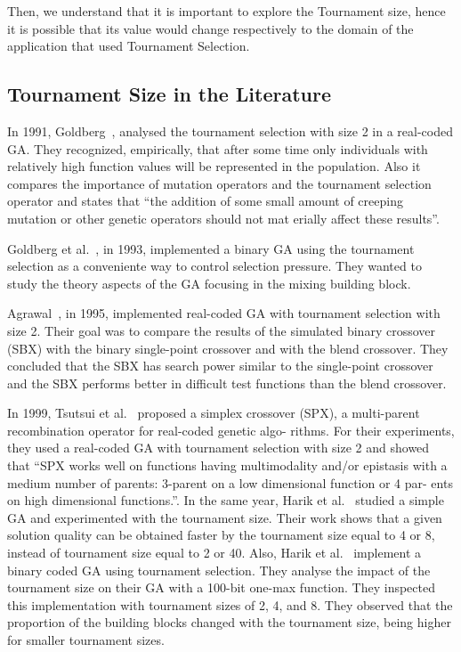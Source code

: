 Then, we understand that it is important to explore the Tournament size, hence it is possible that its value would change respectively to the domain of the application that used Tournament Selection.

\subsection{Tournament Size in the Literature}\label{sec:background:tournament_size} 

In 1991, Goldberg~\cite{goldberg1991real}, analysed the tournament selection with size 2 in a real-coded GA. They recognized, empirically, that after some time only individuals with relatively high function values will be represented in the population. Also it compares the importance of mutation operators and the tournament selection operator and states that ``the addition of some small amount of creeping mutation or other genetic operators should not mat erially affect these results''.

Goldberg et al.~\cite{goldberg1993toward}, in 1993, implemented a binary GA using the tournament selection as a conveniente way to control selection pressure. They wanted to study the theory aspects of the GA focusing in the mixing building block.

Agrawal~\cite{agrawal1995simulated}, in 1995, implemented real-coded GA with tournament selection with size 2. Their goal was to compare the results of the simulated binary crossover (SBX) with the binary single-point crossover and with the blend crossover. They concluded that the SBX  has search power similar to the single-point crossover and the SBX performs better in difficult test functions than the blend crossover. 

In 1999, Tsutsui et al.~\cite{tsutsui1999multi} proposed a simplex crossover (SPX), a multi-parent recombination operator for real-coded genetic algo- rithms. For their experiments, they used a real-coded GA with tournament selection with size 2 and showed that ``SPX works well on functions having multimodality and/or epistasis with a medium number of parents: 3-parent on a low dimensional function or 4 par- ents on high dimensional functions.''. In the same year, Harik et al.~\cite{harik1999compact} studied a simple GA and experimented with the tournament size. Their work shows that a given solution quality can be obtained faster by the tournament size equal to 4 or 8, instead of tournament size equal to 2 or 40. Also, Harik et al.~\cite{harik1999gambler} implement a binary coded GA using tournament selection. They analyse the impact of the tournament size on their GA with a 100-bit one-max function. They inspected this implementation with tournament sizes of 2, 4, and 8. They observed that the proportion of the building blocks changed with the tournament size, being higher for smaller tournament sizes.

